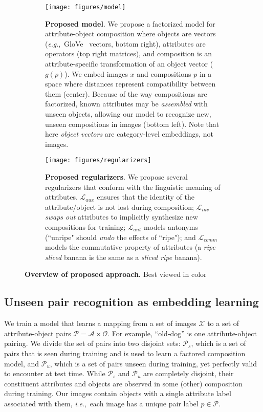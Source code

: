 \documentclass[runningheads]{llncs}
\newcommand{\ie}{\textit{i}.\textit{e}.,~}
\newcommand{\eg}{\textit{e}.\textit{g}.,~}
\begin{document}
\begin{figure}[t!]
\centering
\begin{subfigure}[b]{\textwidth}
   \texttt{[image: figures/model]}\vspace*{-0.1in}
   \caption{\textbf{Proposed model}. We propose a factorized model for attribute-object composition where objects are vectors (\eg GloVe~\cite{pennington2014glove} vectors, bottom right), attributes are operators (top right matrices), and composition is an attribute-specific transformation of an object vector ($g(p)$). We embed images $x$ and compositions $p$ in a space where distances represent compatibility between them (center). Because of the way compositions are factorized, known attributes may be \emph{assembled} with unseen objects, allowing our model to recognize new, unseen compositions in images (bottom left). Note that here \emph{object vectors} are category-level embeddings, not images.}
   \label{fig:model} \vspace*{0.15in}
\end{subfigure}
\begin{subfigure}[b]{\textwidth}
   \texttt{[image: figures/regularizers]}
   \caption{\textbf{Proposed regularizers}. We propose several regularizers that conform with the linguistic meaning of attributes. $\mathcal{L}_{aux}$ ensures that the identity of the attribute/object is not lost during composition; $\mathcal{L}_{inv}$ \emph{swaps out} attributes to implicitly synthesize new compositions for training;  $\mathcal{L}_{ant}$ models antonyms (``unripe" should \emph{undo} the effects of ``ripe"); and $\mathcal{L}_{comm}$ models the commutative property of attributes (a \emph{ripe sliced} banana is the same as a \emph{sliced ripe} banana).}
   \label{fig:regularizers}
\end{subfigure}
\vspace{-0.2in}
\caption{\textbf{Overview of proposed approach.}  Best viewed in color}
\end{figure}

\subsection{Unseen pair recognition as embedding learning} \label{sec:manifold_recap}
\vspace*{-0.05in}
We train a model that learns a mapping from a set of images $\mathcal{X}$ to a set of attribute-object pairs $\mathcal{P} = \mathcal{A} \times \mathcal{O}$.  For example, ``old-dog'' is one attribute-object pairing.  We divide the set of pairs into two disjoint sets: $\mathcal{P}_s$, which is a set of pairs that is seen during training and is used to learn a factored composition model, and $\mathcal{P}_u$, which is a set of pairs unseen during training, yet perfectly valid to encounter at test time.  While $\mathcal{P}_s$ and $\mathcal{P}_u$ are completely disjoint, their constituent attributes and objects are observed in some (other) composition during training. Our images contain objects with a single attribute label associated with them, \ie each image has a unique pair label $p \in \mathcal{P}$.
\end{document}
